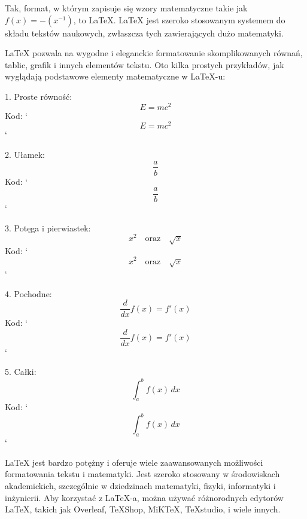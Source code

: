 Tak, format, w którym zapisuje się wzory matematyczne takie jak \( f(x) = -(x^{-1}) \), to LaTeX. LaTeX jest szeroko stosowanym systemem do składu tekstów naukowych, zwłaszcza tych zawierających dużo matematyki. 

LaTeX pozwala na wygodne i eleganckie formatowanie skomplikowanych równań, tablic, grafik i innych elementów tekstu. Oto kilka prostych przykładów, jak wyglądają podstawowe elementy matematyczne w LaTeX-u:

1. Proste równość:
   \[E = mc^2\]
   Kod: `\[ E = mc^2 \]`

2. Ułamek:
   \[\frac{a}{b}\]
   Kod: `\[ \frac{a}{b} \]`

3. Potęga i pierwiastek:
   \[
   x^2 \quad \text{oraz} \quad \sqrt{x}
   \]
   Kod: `\[ x^2 \quad \text{oraz} \quad \sqrt{x} \]`

4. Pochodne:
   \[
   \frac{d}{dx} f(x) = f'(x)
   \]
   Kod: `\[ \frac{d}{dx} f(x) = f'(x) \]`

5. Całki:
   \[
   \int_a^b f(x) \, dx
   \]
   Kod: `\[ \int_a^b f(x) \, dx \]`

LaTeX jest bardzo potężny i oferuje wiele zaawansowanych możliwości formatowania tekstu i matematyki. Jest szeroko stosowany w środowiskach akademickich, szczególnie w dziedzinach matematyki, fizyki, informatyki i inżynierii. Aby korzystać z LaTeX-a, można używać różnorodnych edytorów LaTeX, takich jak Overleaf, TeXShop, MiKTeX, TeXstudio, i wiele innych.